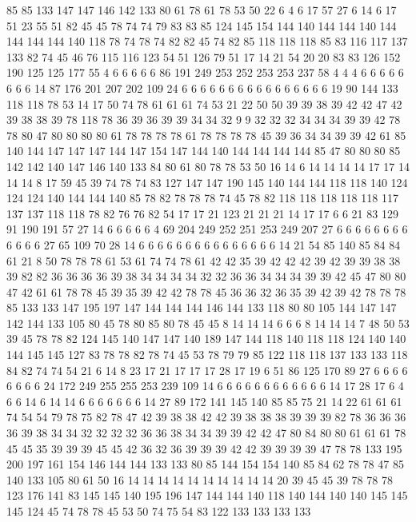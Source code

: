 85 85 133 147 147 146 142 133 80 61 78 61 78 53 50 22 6 4 6 17
57 27 6 14 6 17 51 23 55 51 82 45 45 78 74 74 79 83 83 85
124 145 154 144 140 144 144 140 144 144 144 144 140 118 78 74 78 74 82 82
45 74 82 85 118 118 118 85 83 116 117 137 133 82 74 45 46 76 115 116
123 54 51 126 79 51 17 14 21 54 20 20 83 83 126 152 190 125 125 177
55 4 6 6 6 6 6 86 191 249 253 252 253 253 237 58 4 4 4 6
6 6 6 6 6 6 6 14 87 176 201 207 202 109 24 6 6 6 6 6
6 6 6 6 6 6 6 6 6 6 6 19 90 144 133 118 118 78 53 14
17 50 74 78 61 61 61 74 53 21 22 50 50 39 39 38 39 42 42 47
42 39 38 38 39 78 118 78 36 39 36 39 39 34 34 32 9 9 32 32
32 34 34 34 39 39 42 78 78 80 47 80 80 80 80 61 78 78 78 78
61 78 78 78 78 45 39 36 34 34 39 39 42 61 85 140 144 147 147 147
144 147 154 147 144 140 144 144 144 144 85 47 80 80 80 85 142 142 140 147
146 140 133 84 80 61 80 78 78 53 50 16 14 6 14 14 14 14 17 17
14 14 14 8 17 59 45 39 74 78 74 83 127 147 147 190 145 140 144 144
118 118 140 124 124 124 140 144 144 140 85 78 82 78 78 78 74 45 78 82
118 118 118 118 118 117 137 137 118 118 78 82 76 76 82 54 17 17 21 123
21 21 21 14 17 17 6 6 21 83 129 91 190 191 57 27 14 6 6 6
6 6 4 69 204 249 252 251 253 249 207 27 6 6 6 6 6 6 6 6
6 6 6 6 27 65 109 70 28 14 6 6 6 6 6 6 6 6 6 6
6 6 6 6 6 14 21 54 85 140 85 84 84 61 21 8 50 78 78 78
61 53 61 74 74 78 61 42 42 35 39 42 42 42 39 42 39 39 38 38
39 82 82 36 36 36 36 39 38 34 34 34 34 32 32 36 36 34 34 34
39 39 42 45 47 80 80 47 42 61 61 78 78 45 39 35 39 42 42 78
78 45 36 36 32 36 35 39 42 39 42 78 78 78 85 133 133 147 195 197
147 144 144 144 146 144 133 118 80 80 105 144 147 147 142 144 133 105 80 45
78 80 85 80 78 45 45 8 14 14 14 6 6 6 8 14 14 14 7 48
50 53 39 45 78 78 82 124 145 140 147 147 140 189 147 144 118 140 118 118
124 140 140 144 145 145 127 83 78 78 82 78 74 45 53 78 79 79 85 122
118 118 137 133 133 118 84 82 74 74 54 21 6 14 8 23 17 21 17 17
17 28 17 19 6 51 86 125 170 89 27 6 6 6 6 6 6 6 6 24
172 249 255 255 253 239 109 14 6 6 6 6 6 6 6 6 6 6 6 6
14 17 28 17 6 4 6 6 14 6 14 14 6 6 6 6 6 6 6 14
27 89 172 141 145 140 85 85 75 21 14 22 61 61 61 74 54 54 79 78
75 82 78 47 42 39 38 38 42 42 39 38 38 38 39 39 39 82 78 36
36 36 36 39 38 34 34 32 32 32 32 36 36 38 34 34 39 39 42 42
47 80 84 80 80 61 61 61 78 45 45 35 39 39 39 45 45 42 36 32
36 39 39 39 42 42 39 39 39 39 47 78 78 133 195 200 197 161 154 146
144 144 133 133 80 85 144 154 154 140 85 84 62 78 78 47 85 140 133 105
80 61 50 16 14 14 14 14 14 14 14 14 14 14 20 39 45 45 39 78
78 78 123 176 141 83 145 145 140 195 196 147 144 144 140 118 140 144 140 140
145 145 145 124 45 74 78 78 45 53 50 74 75 54 83 122 133 133 133 133
